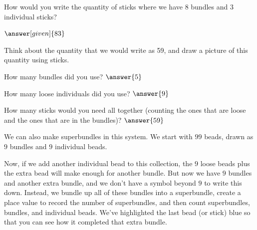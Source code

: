 \documentclass{ximera}
\begin{document}
\begin{question}
How would you write the quantity of sticks where we have $8$ bundles and $3$ individual sticks?

\begin{prompt}
	$\answer[given]{83}$
\end{prompt}
\end{question}


\begin{question}
Think about the quantity that we would write as 59, and draw a picture of this quantity using sticks.

How many bundles did you use? $\answer{5}$

How many loose individuals did you use? $\answer{9}$

How many sticks would you need all together (counting the ones that are loose and the ones that are in the bundles)? $\answer{59}$
\end{question}

We can also make superbundles in this system. We start with $99$ beads, drawn as $9$ bundles and $9$ individual beads. 

\begin{image}
\end{image}

Now, if we add another individual bead to this collection, the $9$ loose beads plus the extra bead will make enough for another bundle. But now we have $9$ bundles and another extra bundle, and we don't have a symbol beyond $9$ to write this down. Instead, we bundle up all of these bundles into a superbundle, create a place value to record the number of superbundles, and then count superbundles, bundles, and individual beads. We've highlighted the last bead (or stick) blue so that you can see how it completed that extra bundle.

\begin{image}
\end{image}
\end{document}
